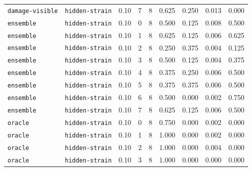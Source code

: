 \documentclass{article}
\begin{document}
\begin{center}
\begin{tabular}{llccccccc}
\texttt{damage-visible} & \texttt{hidden-strain} & 0.10 & 7 & 8 & 0.625 & 0.250 & 0.013 & 0.000 \\
\texttt{ensemble} & \texttt{hidden-strain} & 0.10 & 0 & 8 & 0.500 & 0.125 & 0.008 & 0.500 \\
\texttt{ensemble} & \texttt{hidden-strain} & 0.10 & 1 & 8 & 0.625 & 0.125 & 0.006 & 0.625 \\
\texttt{ensemble} & \texttt{hidden-strain} & 0.10 & 2 & 8 & 0.250 & 0.375 & 0.004 & 0.125 \\
\texttt{ensemble} & \texttt{hidden-strain} & 0.10 & 3 & 8 & 0.500 & 0.125 & 0.004 & 0.375 \\
\texttt{ensemble} & \texttt{hidden-strain} & 0.10 & 4 & 8 & 0.375 & 0.250 & 0.006 & 0.500 \\
\texttt{ensemble} & \texttt{hidden-strain} & 0.10 & 5 & 8 & 0.375 & 0.375 & 0.006 & 0.500 \\
\texttt{ensemble} & \texttt{hidden-strain} & 0.10 & 6 & 8 & 0.500 & 0.000 & 0.002 & 0.750 \\
\texttt{ensemble} & \texttt{hidden-strain} & 0.10 & 7 & 8 & 0.625 & 0.125 & 0.006 & 0.500 \\
\texttt{oracle} & \texttt{hidden-strain} & 0.10 & 0 & 8 & 0.750 & 0.000 & 0.002 & 0.000 \\
\texttt{oracle} & \texttt{hidden-strain} & 0.10 & 1 & 8 & 1.000 & 0.000 & 0.002 & 0.000 \\
\texttt{oracle} & \texttt{hidden-strain} & 0.10 & 2 & 8 & 1.000 & 0.000 & 0.004 & 0.000 \\
\texttt{oracle} & \texttt{hidden-strain} & 0.10 & 3 & 8 & 1.000 & 0.000 & 0.000 & 0.000 \\
\bottomrule
\end{tabular}
\end{center}
\end{document}
